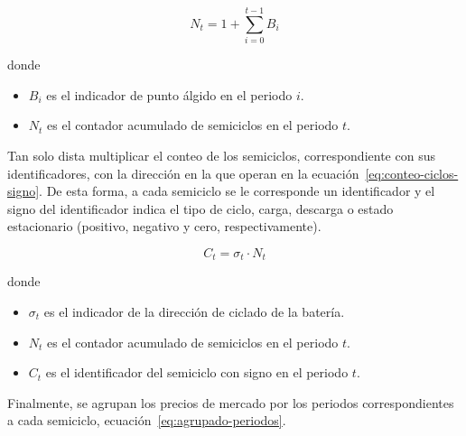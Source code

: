 \begin{samepage}

  \begin{equation}
    \label{eq:conteo-ciclos}
    N_{t} = 1 + \sum_{i=0}^{t-1} B_{i}
  \end{equation}

  donde

  \begin{itemize}

    \item \( B_{i} \) es el indicador de punto álgido en el periodo \( i \).

    \item \( N_{t} \) es el contador acumulado de semiciclos en el periodo \( t \).

  \end{itemize}

\end{samepage}

Tan solo dista multiplicar el conteo de los semiciclos, correspondiente con sus identificadores, con la dirección en la que operan en la ecuación~\ref{eq:conteo-ciclos-signo}. De esta forma, a cada semiciclo se le corresponde un identificador y el signo del identificador indica el tipo de ciclo, carga, descarga o estado estacionario (positivo, negativo y cero, respectivamente).

\begin{samepage}

  \begin{equation}
    \label{eq:conteo-ciclos-signo}
    C_{t} = \sigma_{t} \cdot N_{t}
  \end{equation}

  donde

  \begin{itemize}

    \item \( \sigma_{t} \) es el indicador de la dirección de ciclado de la batería.

    \item \( N_{t} \) es el contador acumulado de semiciclos en el periodo \( t \).

    \item \( C_{t} \) es el identificador del semiciclo con signo en el periodo \( t \).

  \end{itemize}

\end{samepage}

Finalmente, se agrupan los precios de mercado por los periodos correspondientes a cada semiciclo, ecuación~\ref{eq:agrupado-periodos}.

